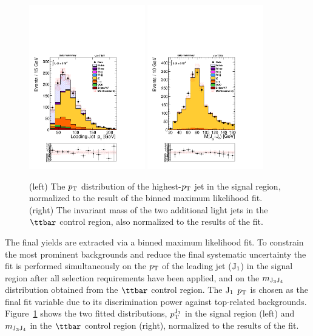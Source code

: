 \begin{figure}
\centering
\includegraphics[width=0.45\textwidth, trim = 0 4cm 0 0, clip=true ]{Wbb/fig4.pdf}
\includegraphics[width=0.45\textwidth, trim = 0 4cm 0 0, clip=true ]{Wbb/fig3.pdf}
\caption{ 
(left) The $p_\mathrm{T}$ distribution of the highest-$p_\mathrm{T}$ jet in the signal region, normalized to the result of the binned maximum likelihood fit.
(right) The invariant mass of the two additional light jets in the $\ttbar$ control region, also
normalized to the results of the fit.
}
\label{figB}
\end{figure}

The final yields are extracted via a binned maximum likelihood fit.
To constrain the most prominent backgrounds and reduce the final
systematic uncertainty the fit is performed simultaneously on the $p_\mathrm{T}$ of the leading jet ($\rm{J_1}$) 
in the signal region after all selection requirements have been applied,
and on the $m_{\rm{J_3 J_4}}$ distribution obtained from the $\ttbar$ control region.
The  $\rm{J_1}$ $p_\mathrm{T}$  is chosen as the final fit variable due to its discrimination power against top-related backgrounds.
Figure~\ref{figB} shows the two fitted distributions, $p_\mathrm{T}^{\rm{J_1}}$  in the signal region (left)
and $m_{\rm{J_3 J_4}}$ in the $\ttbar$ control region (right), normalized to the results of the fit.

